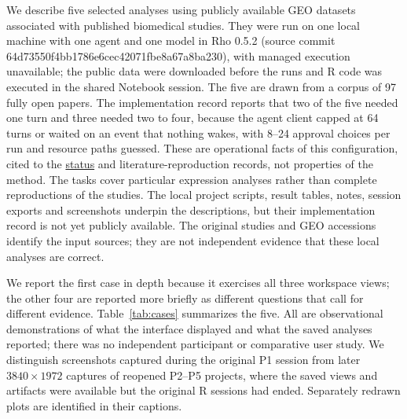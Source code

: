 \documentclass[11pt]{article}
\begin{document}
We describe five selected analyses using publicly available GEO datasets associated with published biomedical studies. They were run on one local machine with one agent and one model in Rho 0.5.2 (source commit 64d73550f4bb1786e6cec42071fbe8a67a8ba230), with managed execution unavailable; the public data were downloaded before the runs and R code was executed in the shared Notebook session. The five are drawn from a corpus of 97 fully open papers. The implementation record reports that two of the five needed one turn and three needed two to four, because the agent client capped at 64 turns or waited on an event that nothing wakes, with 8--24 approval choices per run and resource paths guessed. These are operational facts of this configuration, cited to the \href{https://github.com/YuLab-SMU/Rho/blob/main/docs/STATUS.md}{status} and literature-reproduction records, not properties of the method. The tasks cover particular expression analyses rather than complete reproductions of the studies. The local project scripts, result tables, notes, session exports and screenshots underpin the descriptions, but their implementation record is not yet publicly available. The original studies and GEO accessions identify the input sources; they are not independent evidence that these local analyses are correct.

We report the first case in depth because it exercises all three workspace views; the other four are reported more briefly as different questions that call for different evidence. Table~\ref{tab:cases} summarizes the five. All are observational demonstrations of what the interface displayed and what the saved analyses reported; there was no independent participant or comparative user study. We distinguish screenshots captured during the original P1 session from later $3840 \times 1972$ captures of reopened P2--P5 projects, where the saved views and artifacts were available but the original R sessions had ended. Separately redrawn plots are identified in their captions.
\end{document}
